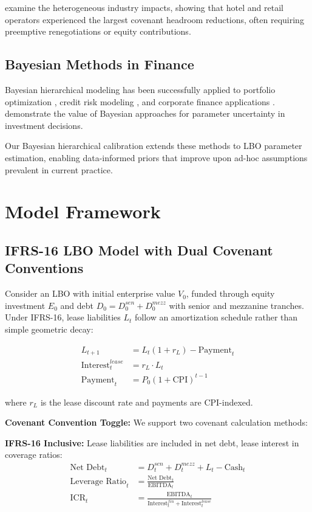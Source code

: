\documentclass[11pt,a4paper]{article}
\begin{document}
\citet{lakshmanan2021lease} examine the heterogeneous industry impacts, showing that hotel and retail operators experienced the largest covenant headroom reductions, often requiring preemptive renegotiations or equity contributions.

\subsection{Bayesian Methods in Finance}

Bayesian hierarchical modeling has been successfully applied to portfolio optimization \citep{black1992global}, credit risk modeling \citep{kiefer2003default}, and corporate finance applications \citep{graham2015corporate}. \citet{pastor2000comparing} demonstrate the value of Bayesian approaches for parameter uncertainty in investment decisions.

Our Bayesian hierarchical calibration extends these methods to LBO parameter estimation, enabling data-informed priors that improve upon ad-hoc assumptions prevalent in current practice.

\section{Model Framework}

\subsection{IFRS-16 LBO Model with Dual Covenant Conventions}

Consider an LBO with initial enterprise value $V_0$, funded through equity investment $E_0$ and debt $D_0 = D_0^{sen} + D_0^{mezz}$ with senior and mezzanine tranches. Under IFRS-16, lease liabilities $L_t$ follow an amortization schedule rather than simple geometric decay:

\begin{align}
L_{t+1} &= L_t(1 + r_L) - \text{Payment}_t \\
\text{Interest}_t^{lease} &= r_L \cdot L_t \\
\text{Payment}_t &= P_0(1 + \text{CPI})^{t-1}
\end{align}

where $r_L$ is the lease discount rate and payments are CPI-indexed.

\textbf{Covenant Convention Toggle:} We support two covenant calculation methods:

\textbf{IFRS-16 Inclusive:} Lease liabilities are included in net debt, lease interest in coverage ratios:
\begin{align}
\text{Net Debt}_t &= D_t^{sen} + D_t^{mezz} + L_t - \text{Cash}_t \\
\text{Leverage Ratio}_t &= \frac{\text{Net Debt}_t}{\text{EBITDA}_t} \\
\text{ICR}_t &= \frac{\text{EBITDA}_t}{\text{Interest}_t^{fin} + \text{Interest}_t^{lease}}
\end{align}
\end{document}
